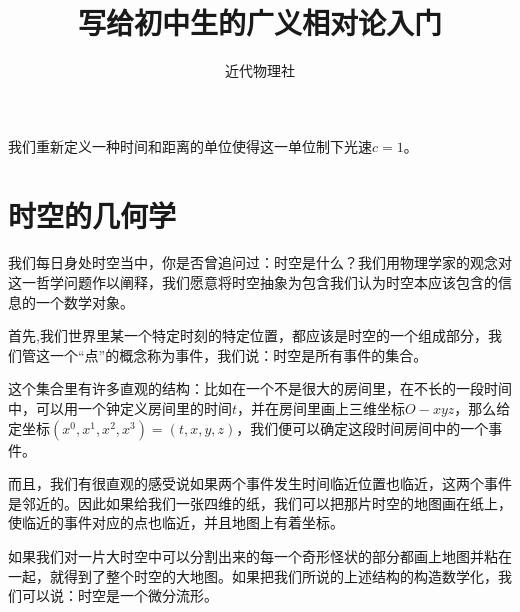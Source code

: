 \documentclass{article}
\begin{document}
\title{写给初中生的广义相对论入门}
\author{近代物理社}
\maketitle
我们重新定义一种时间和距离的单位使得这一单位制下光速$c=1$。
\section{时空的几何学}
我们每日身处时空当中，你是否曾追问过：时空是什么？我们用物理学家的观念对这一哲学问题作以阐释，我们愿意将时空抽象为包含我们认为时空本应该包含的信息的一个数学对象。

首先,我们世界里某一个特定时刻的特定位置，都应该是时空的一个组成部分，我们管这一个“点”的概念称为事件，我们说：时空是所有事件的集合。

这个集合里有许多直观的结构：比如在一个不是很大的房间里，在不长的一段时间中，可以用一个钟定义房间里的时间$t$，并在房间里画上三维坐标$O-xyz$，那么给定坐标$(x^0,x^1,x^2,x^3)=(t,x,y,z)$，我们便可以确定这段时间房间中的一个事件。

而且，我们有很直观的感受说如果两个事件发生时间临近位置也临近，这两个事件是邻近的。因此如果给我们一张四维的纸，我们可以把那片时空的地图画在纸上，使临近的事件对应的点也临近，并且地图上有着坐标。

如果我们对一片大时空中可以分割出来的每一个奇形怪状的部分都画上地图并粘在一起，就得到了整个时空的大地图。如果把我们所说的上述结构的构造数学化，我们可以说：时空是一个微分流形。
\end{document}
